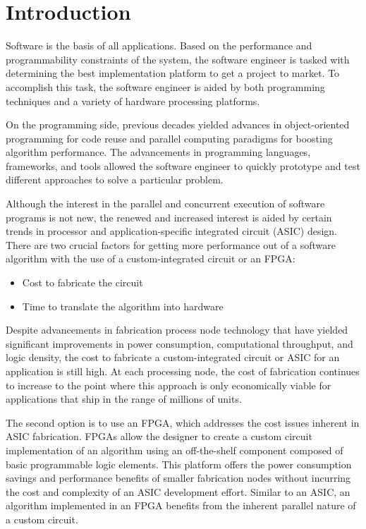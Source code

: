 \section{Introduction}
Software is the basis of all applications. Based on the performance and programmability constraints of the
system, the software engineer is tasked with determining the best implementation platform
to get a project to market. To accomplish this task, the software engineer is aided by both
programming techniques and a variety of hardware processing platforms.

\par On the programming side, previous decades yielded advances in object-oriented
programming for code reuse and parallel computing paradigms for boosting algorithm
performance. The advancements in programming languages, frameworks, and tools
allowed the software engineer to quickly prototype and test different approaches to solve
a particular problem.

\par Although the interest in the parallel and concurrent execution of software
programs is not new, the renewed and increased interest is aided by certain trends in
processor and application-specific integrated circuit (ASIC) design. There are two crucial 
factors for getting more performance out of a software algorithm  with the use of a
custom-integrated circuit or an FPGA:
\begin{itemize}
  \item Cost to fabricate the circuit
  \item Time to translate the algorithm into hardware 
\end{itemize}

Despite advancements in fabrication process node technology that have yielded significant
improvements in power consumption, computational throughput, and logic density, the
cost to fabricate a custom-integrated circuit or ASIC for an application is still high. At each
processing node, the cost of fabrication continues to increase to the point where this
approach is only economically viable for applications that ship in the range of millions of
units.

\par The second option is to use an FPGA, which addresses the cost issues inherent in ASIC
fabrication. FPGAs allow the designer to create a custom circuit implementation of an
algorithm using an off-the-shelf component composed of basic programmable logic
elements. This platform offers the power consumption savings and performance benefits of
smaller fabrication nodes without incurring the cost and complexity of an ASIC
development effort. Similar to an ASIC, an algorithm implemented in an FPGA benefits from
the inherent parallel nature of a custom circuit.

